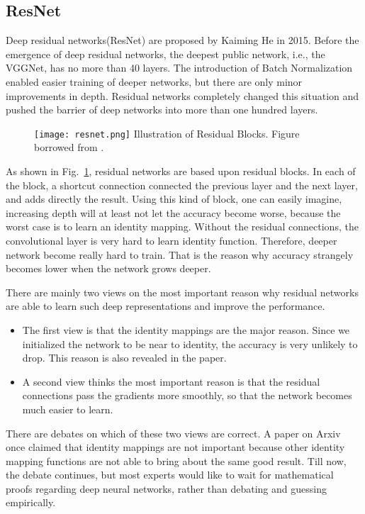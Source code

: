 \subsection{ResNet}
Deep residual networks\cite{he2016deep}(ResNet) are proposed by Kaiming He in 2015. Before the emergence of deep residual networks, the deepest public network, i.e., the VGGNet, has no more than 40 layers. The introduction of Batch Normalization enabled easier training of deeper networks, but there are only minor improvements in depth. Residual networks completely changed this situation and pushed the barrier of deep networks into more than one hundred layers. 
\begin{figure}[!htp]
	\centering
	\texttt{[image: resnet.png]}
	{Illustration of Residual Blocks. Figure borrowed from \parencite{he2016deep}.}
	\label{fig:resnet}
\end{figure}

As shown in Fig.~\ref{fig:resnet}, residual networks are based upon residual blocks. In each of the block, a shortcut connection connected the previous layer and the next layer, and adds directly the result. Using this kind of block, one can easily imagine, increasing depth will at least not let the accuracy become worse, because the worst case is to learn an identity mapping. Without the residual connections, the convolutional layer is very hard to learn identity function. Therefore, deeper network become really hard to train. That is the reason why accuracy strangely becomes lower when the network grows deeper. 

There are mainly two views on the most important reason why residual networks are able to learn such deep representations and improve the performance.
\begin{itemize}
	\item The first view is that the identity mappings are the major reason. Since we initialized the network to be near to identity, the accuracy is very unlikely to drop. This reason is also revealed in the paper.
	\item A second view thinks the most important reason is that the residual connections pass the gradients more smoothly, so that the network becomes much easier to learn.
\end{itemize}
There are debates on which of these two views are correct. A paper on Arxiv once claimed that identity mappings are not important because other identity mapping functions are not able to bring about the same good result. Till now, the debate continues, but most experts would like to wait for mathematical proofs regarding deep neural networks, rather than debating and guessing empirically. 

